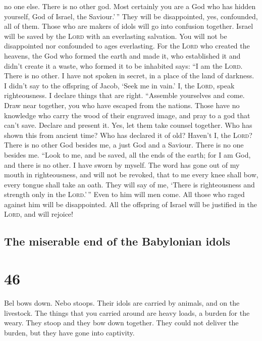 no one else. There is no other god.  Most certainly you
are a God who has hidden yourself, God of Israel, the Saviour.'\,''
 They will be disappointed, yes, confounded, all of them.
Those who are makers of idols will go into confusion together.
 Israel will be saved by the \textsc{Lord} with an
everlasting salvation. You will not be disappointed nor confounded to
ages everlasting.  For the \textsc{Lord} who created the
heavens, the God who formed the earth and made it, who established it
and didn't create it a waste, who formed it to be inhabited says: ``I am
the \textsc{Lord}. There is no other.  I have not spoken
in secret, in a place of the land of darkness. I didn't say to the
offspring of Jacob, `Seek me in vain.' I, the \textsc{Lord}, speak
righteousness. I declare things that are right. 
``Assemble yourselves and come. Draw near together, you who have escaped
from the nations. Those have no knowledge who carry the wood of their
engraved image, and pray to a god that can't save. 
Declare and present it. Yes, let them take counsel together. Who has
shown this from ancient time? Who has declared it of old? Haven't I, the
\textsc{Lord}? There is no other God besides me, a just God and a
Saviour. There is no one besides me.  ``Look to me, and
be saved, all the ends of the earth; for I am God, and there is no
other.  I have sworn by myself. The word has gone out of
my mouth in righteousness, and will not be revoked, that to me every
knee shall bow, every tongue shall take an oath.  They
will say of me, `There is righteousness and strength only in the
\textsc{Lord}.'\,'' Even to him will men come. All those who raged
against him will be disappointed.  All the offspring of
Israel will be justified in the \textsc{Lord}, and will rejoice!

\hypertarget{the-miserable-end-of-the-babylonian-idols}{%
\subsection{The miserable end of the Babylonian
idols}\label{the-miserable-end-of-the-babylonian-idols}}

\hypertarget{section-45}{%
\section{46}\label{section-45}}

 Bel bows down. Nebo stoops. Their idols are carried by
animals, and on the livestock. The things that you carried around are
heavy loads, a burden for the weary.  They stoop and they
bow down together. They could not deliver the burden, but they have gone
into captivity.

